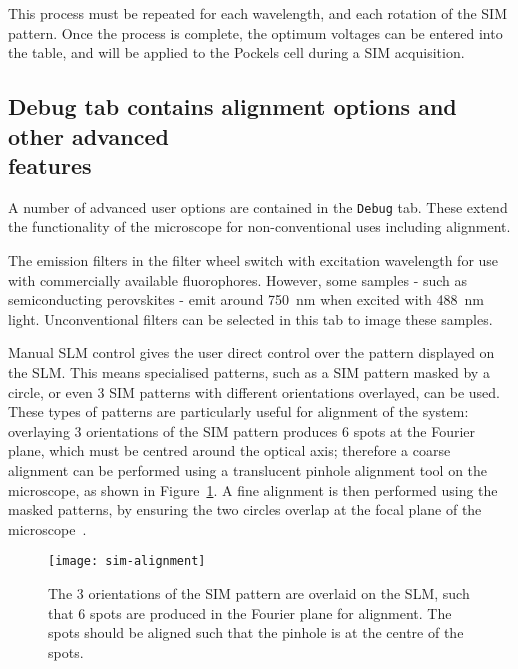 This process must be repeated for each wavelength, and each rotation of the SIM pattern.
Once the process is complete, the optimum voltages can be entered into the table, and will be applied to the Pockels cell during a SIM acquisition.


\subsection[Debug tab contains alignment options and other advanced features]{Debug tab contains alignment options and other advanced\\ features} \label{sec:sim-debug}
A number of advanced user options are contained in the \texttt{Debug} tab.
These extend the functionality of the microscope for non-conventional uses including alignment.

The emission filters in the filter wheel switch with excitation wavelength for use with commercially available fluorophores.
However, some samples - such as semiconducting perovskites - emit around \SI{750}{\nano\metre} when excited with \SI{488}{\nano\metre} light.
Unconventional filters can be selected in this tab to image these samples.

Manual SLM control gives the user direct control over the pattern displayed on the SLM.
This means specialised patterns, such as a SIM pattern masked by a circle, or even 3 SIM patterns with different orientations overlayed, can be used.
These types of patterns are particularly useful for alignment of the system: overlaying 3 orientations of the SIM pattern produces 6 spots at the Fourier plane, which must be centred around the optical axis; therefore a coarse alignment can be performed using a translucent pinhole alignment tool on the microscope, as shown in Figure~\ref{fig:pinhole-alignment}.
A fine alignment is then performed using the masked patterns, by ensuring the two circles overlap at the focal plane of the microscope~\cite{young2016guide}.

\begin{figure}[htbp!]
\centering
\texttt{[image: sim-alignment]}
\caption[LAG SIM: Displaying specially designed patterns on the SLM assists with alignment of LAG SIM]{The 3 orientations of the SIM pattern are overlaid on the SLM, such that 6 spots are produced in the Fourier plane for alignment. The spots should be aligned such that the pinhole is at the centre of the spots.}
\label{fig:pinhole-alignment}
\end{figure}

